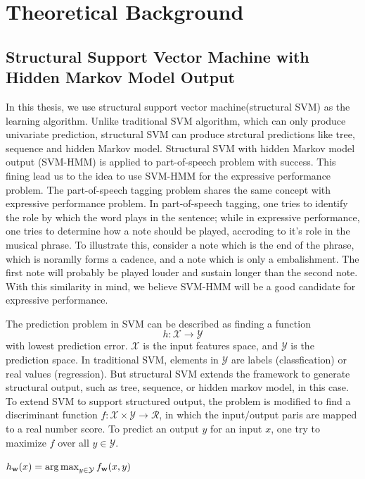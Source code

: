 \chapter{Theoretical Background}
\section{Structural Support Vector Machine with Hidden Markov Model Output}
In this thesis, we use structural support vector machine(structural SVM) as the learning algorithm. Unlike traditional SVM algorithm, which can only produce univariate prediction, structural SVM can produce strctural predictions like tree, sequence and hidden Markov model. Structural SVM with hidden Markov model output (SVM-HMM) is applied to part-of-speech problem with success. This fining lead us to the idea to use SVM-HMM for the expressive performance problem. The part-of-speech tagging problem shares the same concept with expressive performance problem. In part-of-speech tagging, one tries to identify the role by which the word plays in the sentence; while in expressive performance,  one tries to determine how a note should be played, accroding to it's role in the musical phrase. To illustrate this, consider a note which is the end of the phrase, which is noramlly forms a cadence, and a note which is only a embalishment. The first note will probably be played louder and sustain longer than the second note. With this similarity in mind, we believe SVM-HMM will be a good candidate for expressive performance.


The prediction problem in SVM can be described  as finding a function 
$$h: \mathcal{X \rightarrow Y}$$ with lowest prediction error. $\mathcal{X}$ is the input features space, and $\mathcal{Y}$ is the prediction space. In traditional SVM, elements in $\mathcal{Y}$ are labels (classfication) or real values (regression). But structural SVM extends the framework to generate structural output, such as tree, sequence, or hidden markov model, in this case.
To extend SVM to support structured output, the problem is modified to find a discriminant function $f: \mathcal{X} \times \mathcal{Y} \rightarrow \mathcal{R}$, in which the input/output paris are mapped to a real number score. To predict an output $y$ for an input $x$, one try to maximize $f$ over all $y \in \mathcal{Y}$. 

$h_{\mathbf{w}}(x) = \operatorname*{arg\,max}_{y\in\mathcal{Y}} f_{\mathbf{w}}(x,y)$

